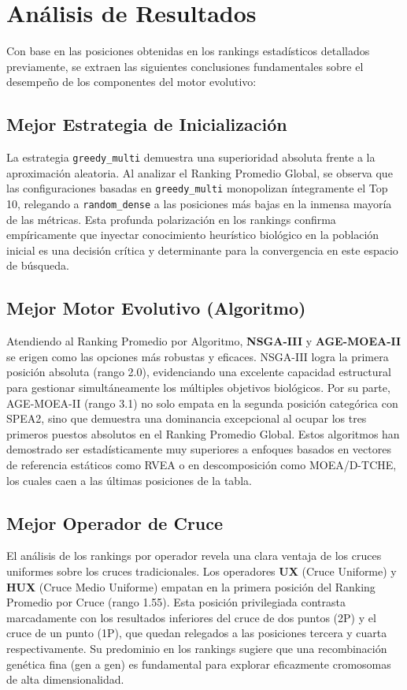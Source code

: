 \documentclass[a4paper,10pt]{article}
\begin{document}
\section{Análisis de Resultados}

Con base en las posiciones obtenidas en los rankings estadísticos detallados previamente, se extraen las siguientes conclusiones fundamentales sobre el desempeño de los componentes del motor evolutivo:

\subsection{Mejor Estrategia de Inicialización}
La estrategia \texttt{greedy\_multi} demuestra una superioridad absoluta frente a la aproximación aleatoria. Al analizar el Ranking Promedio Global, se observa que las configuraciones basadas en \texttt{greedy\_multi} monopolizan íntegramente el Top 10, relegando a \texttt{random\_dense} a las posiciones más bajas en la inmensa mayoría de las métricas. Esta profunda polarización en los rankings confirma empíricamente que inyectar conocimiento heurístico biológico en la población inicial es una decisión crítica y determinante para la convergencia en este espacio de búsqueda.

\subsection{Mejor Motor Evolutivo (Algoritmo)}
Atendiendo al Ranking Promedio por Algoritmo, \textbf{NSGA-III} y \textbf{AGE-MOEA-II} se erigen como las opciones más robustas y eficaces. NSGA-III logra la primera posición absoluta (rango 2.0), evidenciando una excelente capacidad estructural para gestionar simultáneamente los múltiples objetivos biológicos. Por su parte, AGE-MOEA-II (rango 3.1) no solo empata en la segunda posición categórica con SPEA2, sino que demuestra una dominancia excepcional al ocupar los tres primeros puestos absolutos en el Ranking Promedio Global. Estos algoritmos han demostrado ser estadísticamente muy superiores a enfoques basados en vectores de referencia estáticos como RVEA o en descomposición como MOEA/D-TCHE, los cuales caen a las últimas posiciones de la tabla.

\subsection{Mejor Operador de Cruce}
El análisis de los rankings por operador revela una clara ventaja de los cruces uniformes sobre los cruces tradicionales. Los operadores \textbf{UX} (Cruce Uniforme) y \textbf{HUX} (Cruce Medio Uniforme) empatan en la primera posición del Ranking Promedio por Cruce (rango 1.55). Esta posición privilegiada contrasta marcadamente con los resultados inferiores del cruce de dos puntos (2P) y el cruce de un punto (1P), que quedan relegados a las posiciones tercera y cuarta respectivamente. Su predominio en los rankings sugiere que una recombinación genética fina (gen a gen) es fundamental para explorar eficazmente cromosomas de alta dimensionalidad.
\end{document}
